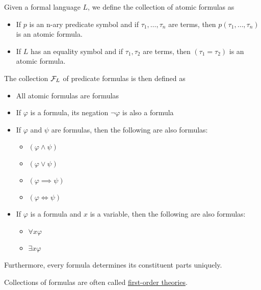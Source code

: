 \begin{definition}\label{def:first_order_formula}\cite[20]{Lectures:logic_programming}
  Given a formal language $L$, we define the collection of atomic formulas as
  \begin{itemize}
    \item If $p$ is an n-ary predicate symbol and if $\tau_1, \ldots, \tau_n$ are terms, then $p(\tau_1, \ldots, \tau_n)$ is an atomic formula.
    \item If $L$ has an equality symbol and if $\tau_1, \tau_2$ are terms, then $(\tau_1 = \tau_2)$ is an atomic formula.
  \end{itemize}

  The collection $\mathcal F_L$ of predicate formulas is then defined as
  \begin{itemize}
    \item All atomic formulas are formulas
    \item If $\varphi$ is a formula, its negation $\neg \varphi$ is also a formula
    \item If $\varphi$ and $\psi$ are formulas, then the following are also formulas:
    \begin{itemize}
      \item $(\varphi \land \psi)$
      \item $(\varphi \lor \psi)$
      \item $(\varphi \implies \psi)$
      \item $(\varphi \iff \psi)$
    \end{itemize}
    \item If $\varphi$ is a formula and $x$ is a variable, then the following are also formulas:
    \begin{itemize}
      \item $\forall x \varphi$
      \item $\exists x \varphi$
    \end{itemize}
  \end{itemize}

  Furthermore, every formula determines its constituent parts uniquely.

  Collections of formulas are often called \uline{first-order theories}.


\end{definition}
